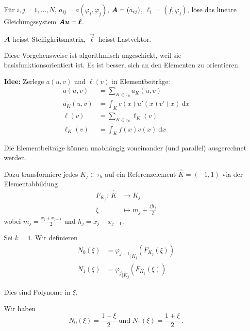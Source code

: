 Für $i,j = 1, \ldots, N$, $a_{ij} = a(\varphi_i, \varphi_j)$, $\boldsymbol{A} = (a_{ij})$, $\ell_i = (f, \varphi_i)$, löse
das lineare Gleichungssystem $\boldsymbol{A} \boldsymbol{u} = \boldsymbol{\ell}$.

$\boldsymbol{A}$ heisst Steifigkeitsmatrix, $\vec \ell$ heisst Lastvektor.

Diese Vorgehensweise ist algorithmisch ungeschickt, weil sie basisfunktionsorientiert ist. Es ist besser, sich an den 
Elementen zu orientieren.

\vspace{1em}
\textbf{Idee:} Zerlege $a(u,v)$ und $\ell(v)$ in Elementbeiträge:
\begin{align*}
    a(u,v) &= \sum_{K \in \tau_h} a_K(u,v) \\
    a_K(u,v) &= \int_K c(x) u'(x) v'(x) \ \mathrm dx \\
    \ell(v) &= \sum_{K \in \tau_h} \ell_K(v) \\
    \ell_K(v) &= \int_K f(x) v(x) \ \mathrm dx
\end{align*}

Die Elementbeiträge können unabhängig voneinander (und parallel) ausgerechnet werden.

Dazu transformiere jedes $K_j \in \tau_h$ auf ein Referenzelement $\hat K = (-1, 1)$ via der Elementabbildung
\begin{align*}
    F_{K_j}: \ \hat K &\to K_j \\
    \xi &\mapsto m_j + \frac{\xi h_j}{2}
\end{align*}
wobei $m_j = \displaystyle \frac{x_j + x_{j-1}}{2}$ und $h_j = x_{j} - x_{j-1}$.

Sei $k=1$. Wir definieren
\begin{align*}
    N_0(\xi) &= {\varphi_{j-1}}_{|K_j}(F_{K_j}(\xi) ) \\
    N_1(\xi) &= {\varphi_j}_{|K_j}( F_{K_j}(\xi) )
\end{align*}

Dies sind Polynome in $\xi$.

Wir haben 
\[
    N_0(\xi) = \frac{1-\xi}{2} \text{ und } N_1(\xi) = \frac{1+\xi}{2} \ .
\]

